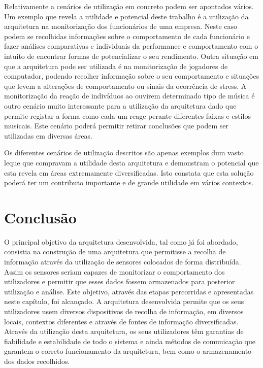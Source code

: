 Relativamente a cenários de utilização em concreto podem ser apontados vários. Um exemplo que revela a utilidade e potencial deste trabalho é a utilização da arquitetura na monitorização dos funcionários de uma empresa. Neste caso podem se recolhidas informações sobre o comportamento de cada funcionário e fazer análises comparativas e individuais da performance e comportamento com o intuito de encontrar formas de potencializar o seu rendimento. Outra situação em que a arquitetura pode ser utilizada é na monitorização de jogadores de computador, podendo recolher informação sobre o seu comportamento e situações que levem a alterações de comportamento ou sinais da ocorrência de stress. A monitorização da reação de indivíduos ao ouvirem determinado tipo de música é outro cenário muito interessante para a utilização da arquitetura dado que permite registar a forma como cada um reage perante diferentes faixas e estilos musicais. Este cenário poderá permitir retirar conclusões que podem ser utilizadas em diversas áreas.

Os diferentes cenários de utilização descritos são apenas exemplos dum vasto leque que compravam a utilidade desta arquitetura e demonstram o potencial que esta revela em áreas extremamente diversificadas. Isto constata que esta solução poderá ter um contributo importante e de grande utilidade em vários contextos.

\section{Conclusão}

O principal objetivo da arquitetura desenvolvida, tal como já foi abordado, consistia na construção de uma arquitetura que permitisse a recolha de informação através da utilização de sensores colocados de forma distribuída. Assim os sensores seriam capazes de monitorizar o comportamento dos utilizadores e permitir que esses dados fossem armazenados para posterior utilização e análise. Este objetivo, através das etapas percorridas e apresentadas neste capítulo, foi alcançado. A arquitetura desenvolvida permite que os seus utilizadores usem diversos dispositivos de recolha de informação, em diversos locais, contextos diferentes e através de fontes de informação diversificadas. Através da utilização desta arquitetura, os seus utilizadores têm garantias de fiabilidade e estabilidade de todo o sistema e ainda métodos de comunicação que garantem o correto funcionamento da arquitetura, bem como o armazenamento dos dados recolhidos.

